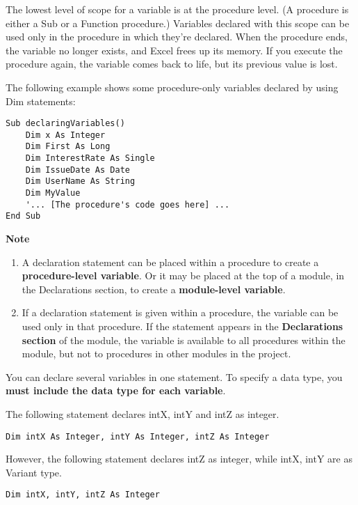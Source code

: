 \documentclass[
]{article}
\theoremstyle{definition}
\theoremstyle{definition}
\theoremstyle{definition}
\theoremstyle{definition}
\theoremstyle{remark}
\begin{document}
The lowest level of scope for a variable is at the procedure level. (A
procedure is either a Sub or a Function procedure.) Variables declared
with this scope can be used only in the procedure in which they're
declared. When the procedure ends, the variable no longer exists, and
Excel frees up its memory. If you execute the procedure again, the
variable comes back to life, but its previous value is lost.

The following example shows some procedure-only variables declared by
using Dim statements:

\begin{verbatim}
Sub declaringVariables()
    Dim x As Integer
    Dim First As Long
    Dim InterestRate As Single
    Dim IssueDate As Date
    Dim UserName As String
    Dim MyValue
    '... [The procedure's code goes here] ...
End Sub
\end{verbatim}

\textbf{Note}

\begin{enumerate}
\def\labelenumi{\arabic{enumi}.}
\item
  A declaration statement can be placed within a procedure to create a
  \textbf{procedure-level variable}. Or it may be placed at the top of a
  module, in the Declarations section, to create a \textbf{module-level
  variable}.
\item
  If a declaration statement is given within a procedure, the variable
  can be used only in that procedure. If the statement appears in the
  \textbf{Declarations section} of the module, the variable is available to
  all procedures within the module, but not to procedures in other
  modules in the project.
\end{enumerate}

You can declare several variables in one statement. To specify a data
type, you \textbf{must include the data type for each variable}.

The following statement declares intX, intY and intZ as integer.

\begin{verbatim}
Dim intX As Integer, intY As Integer, intZ As Integer
\end{verbatim}

However, the following statement declares intZ as integer, while intX,
intY are as Variant type.

\begin{verbatim}
Dim intX, intY, intZ As Integer
\end{verbatim}
\end{document}
